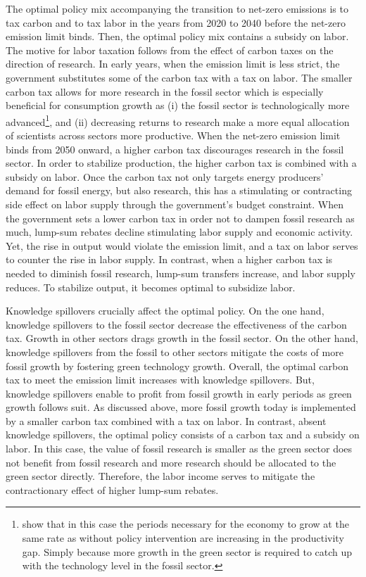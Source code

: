 The optimal policy mix accompanying the transition to net-zero emissions is to tax carbon and to tax labor in the years from 2020 to 2040 before the net-zero emission limit binds. Then, the optimal policy mix contains a subsidy on labor. The motive for labor taxation follows from the effect of carbon taxes on the direction of research. In early years, when the emission limit is less strict, the government substitutes some of the carbon tax with a tax on labor. The smaller carbon tax allows for more research in the fossil sector which is especially beneficial for consumption growth as (i) the fossil sector is technologically more advanced\footnote{\citep{Acemoglu2012TheChange} show that in this case the periods necessary for the economy to grow at the same rate as without policy intervention are increasing in the productivity gap. Simply because more growth in the green sector is required  to catch up with the technology level in the fossil sector.}, and (ii) decreasing returns to research make a more equal allocation of scientists across sectors more productive. 
When the net-zero emission limit binds from 2050 onward, a higher carbon tax discourages research in the fossil sector. In order to stabilize production, the higher carbon tax is combined with a subsidy on labor. 
Once the carbon tax not only targets energy producers’ demand for fossil energy, but also research, this has a stimulating or contracting side effect on labor supply through the government’s budget constraint.  When the government sets a lower carbon tax in order not to dampen fossil research as much, lump-sum rebates decline stimulating labor supply and economic activity. Yet, the rise in output would violate the emission limit, and a tax on labor serves to counter the rise in labor supply. In contrast, when a higher carbon tax is needed to diminish fossil research, lump-sum transfers increase, and labor supply reduces. To stabilize output, it becomes optimal to subsidize labor. 

Knowledge spillovers crucially affect the optimal policy.  On the one hand, knowledge spillovers to the fossil sector decrease the effectiveness of the carbon tax. Growth in other sectors drags growth in the fossil sector. On the other hand, knowledge spillovers from the fossil to other sectors mitigate the costs of more fossil growth by fostering green technology growth. 
Overall, the optimal carbon tax to meet the emission limit increases with knowledge spillovers. But, knowledge spillovers enable to profit from fossil growth in early periods as green growth follows suit.  As discussed above, more fossil growth today is implemented by a smaller carbon tax combined with a tax on labor. 
In contrast, absent knowledge spillovers, the optimal policy consists of a carbon tax and a subsidy on labor. In this case, the value of fossil research is smaller as the green sector does not benefit from fossil research and more research should be allocated to the green sector directly. Therefore, the labor income serves to mitigate the contractionary effect of higher lump-sum rebates. 

